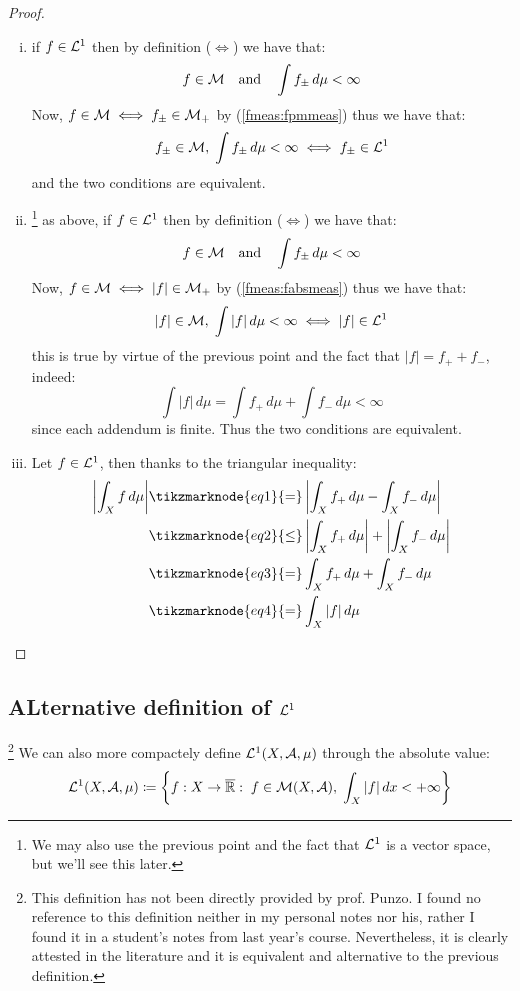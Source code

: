 \begin{proof}
    \hspace*{\fill} %
    \begin{enumerate}[i)]
        \item if $f\in\mathcal{L}^1$ then by definition ($\iff$) we have that:
            \[
                f\in\mathcal{M} \quad \text{and} \quad \int f_{\pm} \, d\mu < \infty    
            \]
            Now, $f\in\mathcal{M} \iff f_{\pm}\in\mathcal{M}_+$ by (\ref{fmeas:fpmmeas}) thus we have that:
            \[
                f_{\pm}\in \mathcal{M}, \;\int f_{\pm} \, d\mu < \infty  \iff f_{\pm}\in\mathcal{L}^1
            \]
            and the two conditions are equivalent.
        \item \footnote{
            We may also use the previous point and the fact that $\mathcal{L}^1$ is a vector space, but we'll see this later.
        } as above, if $f\in\mathcal{L}^1$ then by definition ($\iff$) we have that:
            \[
                f\in\mathcal{M} \quad \text{and} \quad \int f_{\pm} \, d\mu < \infty    
            \]
            Now, $f\in\mathcal{M} \iff |f|\in\mathcal{M}_+$ by (\ref{fmeas:fabsmeas}) thus we have that:
            \[
                |f|\in \mathcal{M}, \;\int |f| \, d\mu < \infty  \iff |f|\in\mathcal{L}^1
            \]
            this is true by virtue of the previous point and the fact that $|f| = f_+ + f_-$, indeed:
            \[
                \int |f| \, d\mu = \int f_+ \, d\mu + \int f_- \, d\mu < \infty
            \]
            since each addendum is finite. Thus the two conditions are equivalent.
        \item Let $f\in\mathcal{L}^1$, then thanks to the triangular inequality:
            \begin{align*}
                \left| \int_X f \, d\mu \right| & \tikzmarknode{eq1}{=} \left| \int_X f_+ \, d\mu - \int_X f_- \, d\mu \right| \\
                & \tikzmarknode{eq2}{\leq} \left| \int_X f_+ \, d\mu \right| + \left| \int_X f_- \, d\mu \right| \\
                & \tikzmarknode{eq3}{=} \int_X f_+ \, d\mu + \int_X f_- \, d\mu\\
                & \tikzmarknode{eq4}{=} \int_X |f| \, d\mu
            \end{align*} 
    \end{enumerate}    
\end{proof}

\subsection{ALternative definition of \texorpdfstring{$\mathcal{L}^1$}{L1}} \footnote{This definition has not been directly provided by prof. Punzo. I found no reference to this definition neither in my personal notes nor his, rather I found it in a student's notes from last year's course. Nevertheless, it is clearly attested in the literature and it is equivalent and alternative to the previous definition.}
We can also more compactely define $\mathcal{L}^1(X,\mathcal{A},\mu)$ through the absolute value:
\[
    \mathcal{L}^1(X,\mathcal{A},\mu) \coloneqq \left\{ f:X\to\overline{\mathbb{R}}: \; f\in\mathcal{M}(X,\mathcal{A}), \; \int_X |f| \, dx < +\infty  \right\}
\]


